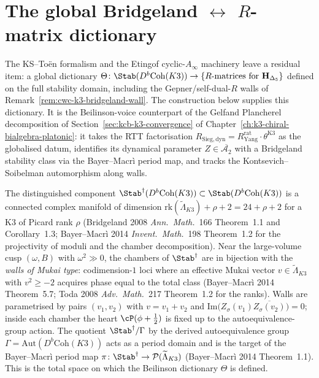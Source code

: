 \section{The global Bridgeland \texorpdfstring{$\leftrightarrow$}{<->} \texorpdfstring{$R$}{R}-matrix dictionary}
\label{sec:cwc-global-bridgeland-rmatrix}

The KS--To\"en formalism and the Etingof cyclic-$A_\infty$ machinery
leave a residual item: a global dictionary
$\Theta\colon \Stab(D^b\mathrm{Coh}(K3))\to\{R\text{-matrices for
}\mathbf{H}_{\Delta_5}\}$ defined on the full stability domain, including the
Gepner/self-dual-$R$ walls of
Remark~\ref{rem:cwc-k3-bridgeland-wall}. The construction below
supplies this dictionary. It is the Beilinson-voice counterpart of
the Gelfand Plancherel decomposition of
Section~\ref{sec:kcb-k3-convergence} of
Chapter~\ref{ch:k3-chiral-bialgebra-platonic}: it takes the RTT
factorisation $R_{\mathrm{Sieg,dyn}}=R^{\mathrm{rat}}_{\mathrm{Yang}}\cdot
\theta^{\mathrm{K3}}$ as the globalised datum, identifies its dynamical
parameter $Z\in\overline{\mathcal{A}_2}$ with a Bridgeland stability
class via the Bayer--Macr\`i period map, and tracks the
Kontsevich--Soibelman automorphism along walls.

\begin{remark}
\label{rem:cwc-bridgeland-chambers}
The distinguished component
$\Stab^\dagger(D^b\mathrm{Coh}(K3))\subset \Stab(D^b\mathrm{Coh}(K3))$
is a connected complex manifold of dimension $\mathrm{rk}(\widetilde{\Lambda}_{K3})
+ \rho+2 = 24 + \rho+2$ for a K3 of Picard rank $\rho$
(Bridgeland 2008 \emph{Ann.\ Math.}~166 Theorem~1.1 and Corollary~1.3;
Bayer--Macr\`i 2014 \emph{Invent.\ Math.}~198 Theorem~1.2 for the
projectivity of moduli and the chamber decomposition). Near the
large-volume cusp $(\omega,B)$ with $\omega^2\gg 0$, the chambers of
$\Stab^\dagger$ are in bijection with the \emph{walls of Mukai type}:
codimension-$1$ loci where an effective Mukai vector
$v\in\widetilde{\Lambda}_{K3}$ with
$v^2\ge -2$ acquires phase equal to the total class
(Bayer--Macr\`i 2014 Theorem~5.7; Toda 2008 \emph{Adv.\ Math.}~217
Theorem~1.2 for the ranks). Walls are parametrised by pairs
$(v_1,v_2)$ with $v=v_1+v_2$ and
$\mathrm{Im}\bigl(Z_\sigma(v_1)\overline{Z_\sigma(v_2)}\bigr)=0$;
inside each chamber the heart $\cP(\phi+\tfrac{1}{2})$ is fixed up to
the autoequivalence-group action. The quotient
$\Stab^\dagger/\Gamma$ by the derived autoequivalence group
$\Gamma=\mathrm{Aut}(D^b\mathrm{Coh}(K3))$ acts as a period domain and
is the target of the Bayer--Macr\`i period map
$\pi\colon\Stab^\dagger\to\mathcal{P}(\widetilde{\Lambda}_{K3})$
(Bayer--Macr\`i 2014 Theorem~1.1). This is the total space on which
the Beilinson dictionary $\Theta$ is defined.
\end{remark}

